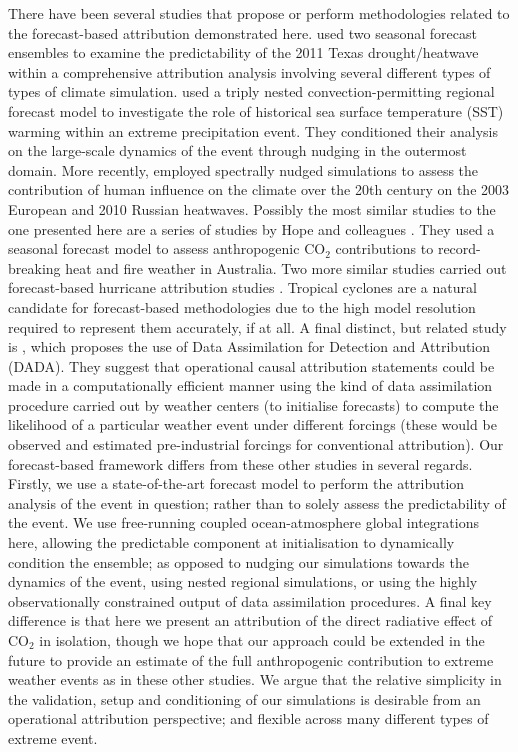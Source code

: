   There have been several studies that propose or perform methodologies related to the forecast-based attribution demonstrated here. \citet{hoerling_anatomy_2013} used two seasonal forecast ensembles to examine the predictability of the 2011 Texas drought/heatwave within a comprehensive attribution analysis involving several different types of types of climate simulation. \citet{meredith_crucial_2015} used a triply nested convection-permitting regional forecast model to investigate the role of historical sea surface temperature (SST) warming within an extreme precipitation event. They conditioned their analysis on the large-scale dynamics of the event through nudging in the outermost domain. More recently, \citet{van_garderen_methodology_2021} employed spectrally nudged simulations to assess the contribution of human influence on the climate over the 20th century on the 2003 European and 2010 Russian heatwaves. Possibly the most similar studies to the one presented here are a series of studies by Hope and colleagues \citep{hope_contributors_2015,hope_what_2016,hope_determining_2019}. They used a seasonal forecast model to assess anthropogenic CO$_2$ contributions to record-breaking heat and fire weather in Australia. Two more similar studies carried out forecast-based hurricane attribution studies \citep{reed_forecasted_2020,lackmann_hurricane_2015}. Tropical cyclones are a natural candidate for forecast-based methodologies due to the high model resolution required to represent them accurately, if at all. A final distinct, but related study is \citet{hannart_dada_2016}, which proposes the use of Data Assimilation for Detection and Attribution (DADA). They suggest that operational causal attribution statements could be made in a computationally efficient manner using the kind of data assimilation procedure carried out by weather centers (to initialise forecasts) to compute the likelihood of a particular weather event under different forcings (these would be observed and estimated pre-industrial forcings for conventional attribution). Our forecast-based framework differs from these other studies in several regards. Firstly, we use a state-of-the-art forecast model to perform the attribution analysis of the event in question; rather than to solely assess the predictability of the event. We use free-running coupled ocean-atmosphere global integrations here, allowing the predictable component at initialisation to dynamically condition the ensemble; as opposed to nudging our simulations towards the dynamics of the event, using nested regional simulations, or using the highly observationally constrained output of data assimilation procedures. A final key difference is that here we present an attribution of the direct radiative effect of CO$_2$ in isolation, though we hope that our approach could be extended in the future to provide an estimate of the full anthropogenic contribution to extreme weather events as in these other studies. We argue that the relative simplicity in the validation, setup and conditioning of our simulations is desirable from an operational attribution perspective; and flexible across many different types of extreme event. 

